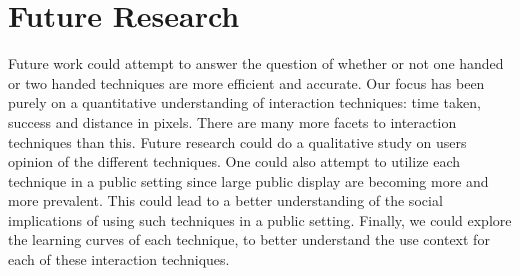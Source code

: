 \section{Future Research} \label{sec:futureresearch}
Future work could attempt to answer the question of whether or not one handed or two handed techniques are more efficient and accurate.
Our focus has been purely on a quantitative understanding of interaction techniques: time taken, success and distance in pixels.
There are many more facets to interaction techniques than this. 
Future research could do a qualitative study on users opinion of the different techniques. 
One could also attempt to utilize each technique in a public setting since large public display are becoming more and more prevalent. 
This could lead to a better understanding of the social implications of using such techniques in a public setting.
Finally, we could explore the learning curves of each technique, to better understand the use context for each of these interaction techniques. 
